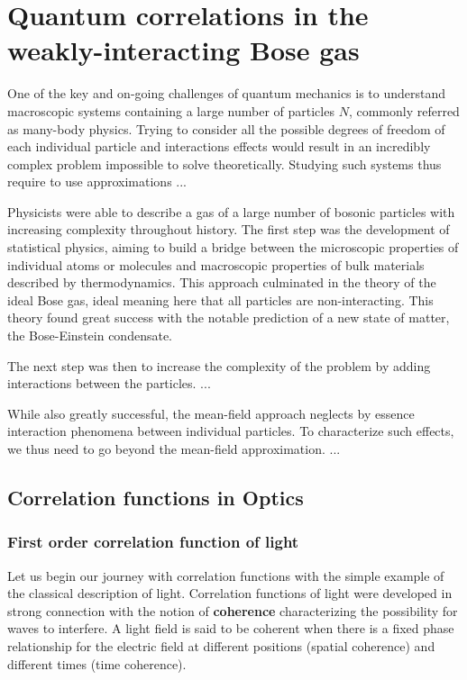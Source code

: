 \chapter{Quantum correlations in the weakly-interacting Bose gas}

\label{sec:chapter_1}


One of the key and on-going challenges of quantum mechanics is to understand macroscopic systems containing a large number of particles $N$, commonly referred as many-body physics. Trying to consider all the possible degrees of freedom of each individual particle and interactions effects would result in an incredibly complex problem impossible to solve theoretically. Studying such systems thus require to use approximations ...

Physicists were able to describe a gas of a large number of bosonic particles with increasing complexity throughout history. The first step was the development of statistical physics, aiming to build a bridge between the microscopic properties of individual atoms or molecules and macroscopic properties of bulk materials described by thermodynamics. This approach culminated in the theory of the ideal Bose gas, ideal meaning here that all particles are non-interacting. This theory found great success with the notable prediction of a new state of matter, the Bose-Einstein condensate. 

The next step was then to increase the complexity of the problem by adding interactions between the particles. ...

While also greatly successful, the mean-field approach neglects by essence interaction phenomena between individual particles. To characterize such effects, we thus need to go beyond the mean-field approximation. ...




\section{Correlation functions in Optics}

\subsection{First order correlation function of light}

Let us begin our journey with correlation functions with the simple example of the classical description of light. Correlation functions of light were developed in strong connection with the notion of \textbf{coherence} characterizing the possibility for waves to interfere. A light field is said to be coherent when there is a fixed phase relationship for the electric field at different positions (spatial coherence) and different times (time coherence). 


